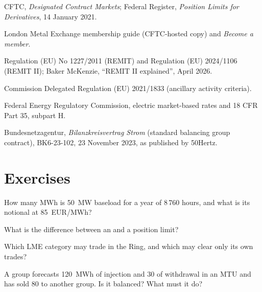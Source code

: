 \begin{omsources}
\item CFTC, \emph{Designated Contract Markets}; Federal Register, \emph{Position Limits for Derivatives}, 14
January 2021.
\item London Metal Exchange membership guide (CFTC-hosted copy) and \emph{Become a member}.
\item Regulation (EU) No 1227/2011 (REMIT) and Regulation (EU) 2024/1106 (REMIT II); Baker McKenzie, ``REMIT II
explained'', April 2026.
\item Commission Delegated Regulation (EU) 2021/1833 (ancillary activity criteria).
\item Federal Energy Regulatory Commission, electric market-based rates and 18 CFR Part 35, subpart H.
\item Bundesnetzagentur, \emph{Bilanzkreisvertrag Strom} (standard balancing group contract), BK6-23-102, 23 November 2023, as published by 50Hertz.
\end{omsources}

\section{Exercises}

\begin{exercise}[$\star$]\label{exo:m3:getting-access-commodities-and-power:1}
How many MWh is 50~MW baseload for a year of 8\,760 hours, and what is its notional at \qty{85}{EUR/MWh}?
\end{exercise}

\begin{exercise}[$\star$]\label{exo:m3:getting-access-commodities-and-power:2}
What is the difference between an  and a position limit?
\end{exercise}

\begin{exercise}[$\star$]\label{exo:m3:getting-access-commodities-and-power:3}
Which LME category may trade in the Ring, and which may clear only its own trades?
\end{exercise}

\begin{exercise}[$\star\star$]\label{exo:m3:getting-access-commodities-and-power:4}
A group forecasts 120~MWh of injection and 30 of withdrawal in an MTU and has sold 80 to another group. Is it
balanced? What must it do?
\end{exercise}

